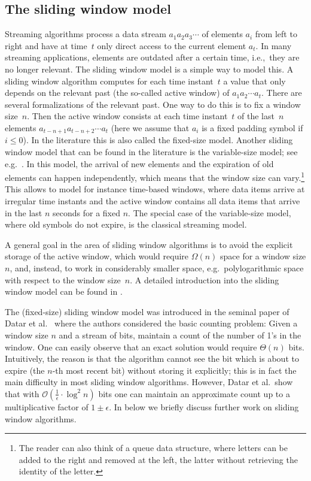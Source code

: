 \documentclass{article}\usepackage[a4paper,margin=20mm]{geometry}
\renewcommand{\O}{\mathcal{O}}
\renewcommand{\leq}{\leqslant}
\begin{document}
\subsection{The sliding window model}

Streaming algorithms process a data stream $a_1 a_2 a_3 \cdots$
of elements $a_i$ from left to right and have at time~$t$ only direct access to the current element $a_t$.
In many streaming applications, elements are outdated after a certain time, i.e.,~they are no longer relevant.
The sliding window model is a simple way to model this.
A sliding window algorithm computes for each time instant~$t$ a value
that only depends on the relevant past (the so-called active window) of $a_1 a_2 \cdots a_t$. 
There are several formalizations of the relevant past. One way to do this is to fix a 
window size~$n$. Then the active window consists at each time instant~$t$ of the last~$n$
elements $a_{t-n+1} a_{t-n+2} \cdots a_t$ (here we assume that $a_i$ is a fixed padding symbol if $i \leq 0$). In the literature this is also called the fixed-size model.
Another sliding window model that can be found in the literature is the variable-size model; see e.g.~\cite{ArasuM04}.
In this model, the arrival of new elements and the expiration of old elements
can happen independently, which means that the window size can vary.\footnote{The reader can also think of a 
queue data structure, where letters can be added to the right and removed at the left, the latter without retrieving the identity of the letter.}
This allows to model for instance time-based windows, where data items arrive at irregular
time instants and the active window contains
all data items that arrive in the last $n$ seconds for a fixed $n$.
The special case of the variable-size model, where old symbols do not expire, is the classical
streaming model.

A general goal in the area of sliding window algorithms is to avoid the explicit storage
of the active window, which would require $\Omega(n)$ space for a window size $n$, and,
instead, to work in considerably smaller space,
e.g.~polylogarithmic space with respect to the window size~$n$.
A detailed introduction into the sliding window model can be found in \cite[Chapter~8]{Aggarwal07}.

The (fixed-size) sliding window model was introduced
in the seminal paper of Datar et al.~\cite{DatarGIM02}
where the authors considered the basic counting problem:
Given a window size $n$ and a stream of bits,
maintain a count of the number of 1’s in the window.
One can easily observe that an exact solution would require $\Theta(n)$ bits.
Intuitively, the reason is that the algorithm cannot see the bit which is
about to expire (the $n$-th most recent bit) without storing it explicitly; this is in fact the main difficulty
in most sliding window algorithms.
However, Datar et al.~show that with $\O(\frac{1}{\epsilon} \cdot \log^2 n)$ bits
one can maintain an approximate count up to a multiplicative factor of $1 \pm \epsilon$.
In  below we briefly discuss further work on sliding window
algorithms.
\end{document}
